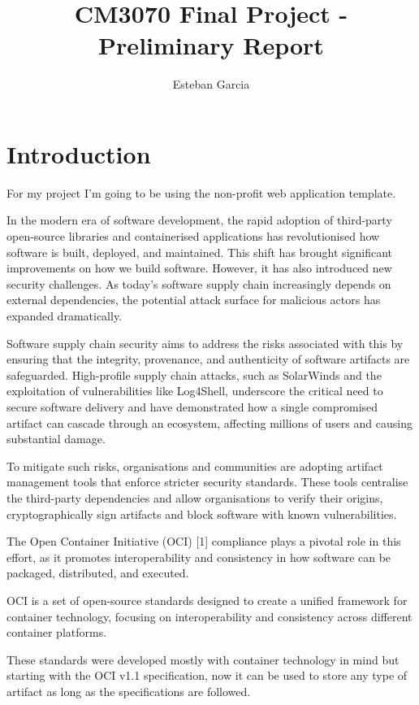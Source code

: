 \documentclass{article}
\title{CM3070 Final Project - Preliminary Report}
\author{Esteban Garcia}
\date{ }
\begin{document}
  \maketitle

  \tableofcontents

  \newpage
  \section{Introduction}

  For my project I'm going to be using the non-profit web application template.

  In the modern era of software development, the rapid adoption of third-party open-source libraries and containerised applications has revolutionised how software is built, deployed, and maintained. This shift has brought significant improvements on how we build software. However, it has also introduced new security challenges. As today's software supply chain increasingly depends on external dependencies, the potential attack surface for malicious actors has expanded dramatically.

  Software supply chain security aims to address the risks associated with this by ensuring that the integrity, provenance, and authenticity of software artifacts are safeguarded. High-profile supply chain attacks, such as SolarWinds and the exploitation of vulnerabilities like Log4Shell, underscore the critical need to secure software delivery and have demonstrated how a single compromised artifact can cascade through an ecosystem, affecting millions of users and causing substantial damage.

  To mitigate such risks, organisations and communities are adopting artifact management tools that enforce stricter security standards. These tools centralise the third-party dependencies and allow organisations to verify their origins, cryptographically sign artifacts and block software with known vulnerabilities.

  The Open Container Initiative (OCI) [1] compliance plays a pivotal role in this effort, as it promotes interoperability and consistency in how software can be packaged, distributed, and executed.

  OCI is a set of open-source standards designed to create a unified framework for container technology, focusing on interoperability and consistency across different container platforms.

  These standards were developed mostly with container technology in mind but starting with the OCI v1.1 specification, now it can be used to store any type of artifact as long as the specifications are followed.
\end{document}
